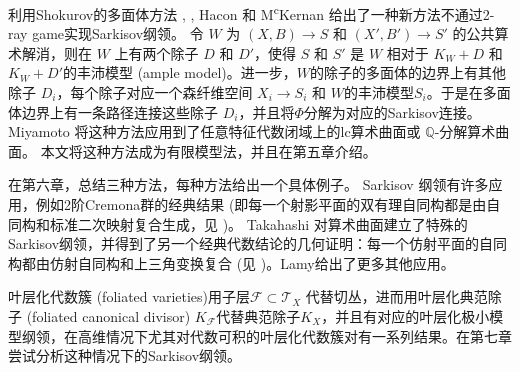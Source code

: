 利用Shokurov的多面体方法 \cite{Sho96}, \cite{cs11}, Hacon 和 M\textsuperscript{c}Kernan \cite{haconSarkisovProgram2012}给出了一种新方法不通过2-ray game实现Sarkisov纲领。
令 $W$ 为 $(X,B)\to S$ 和 $(X',B')\to S'$ 的公共算术解消，则在 $W$ 上有两个除子 $D$ 和 $D'$，使得 $S$ 和 $S'$ 是 $W$ 相对于 $K_W+D$ 和 $K_W+D'$的丰沛模型 (ample model)。进一步，$W$的除子的多面体的边界上有其他除子 $D_{i}$，每个除子对应一个森纤维空间 $X_{i}\to S_{i}$ 和 $W$的丰沛模型$S_{i}$。于是在多面体边界上有一条路径连接这些除子 $D_{i}$，并且将$\Phi$分解为对应的Sarkisov连接。
Miyamoto \cite{miyamoto2019TheSP} 将这种方法应用到了任意特征代数闭域上的lc算术曲面或 $\mathbb{Q}$-分解算术曲面。
本文将这种方法成为有限模型法，并且在第五章介绍。

在第六章，总结三种方法，每种方法给出一个具体例子。 Sarkisov 纲领有许多应用，例如2阶Cremona群的经典结果 (即每一个射影平面的双有理自同构都是由自同构和标准二次映射复合生成，见 \cite[Chapter 2]{ksc04} )。 Takahashi \cite{tak95} 对算术曲面建立了特殊的Sarkisov纲领，并得到了另一个经典代数结论的几何证明：每一个仿射平面的自同构都由仿射自同构和上三角变换复合 (见 \cite[Chpter 13]{mat02})。Lamy\cite{lam22}给出了更多其他应用。

叶层化代数簇 (foliated varieties)用子层$\mathcal{F} \subset \mathcal{T}_{X}$ 代替切丛，进而用叶层化典范除子 (foliated canonical divisor) $K_{\mathcal{F}}$代替典范除子$K_{X}$，并且有对应的叶层化极小模型纲领，在高维情况下尤其对代数可积的叶层化代数簇对有一系列结果。在第七章尝试分析这种情况下的Sarkisov纲领。
